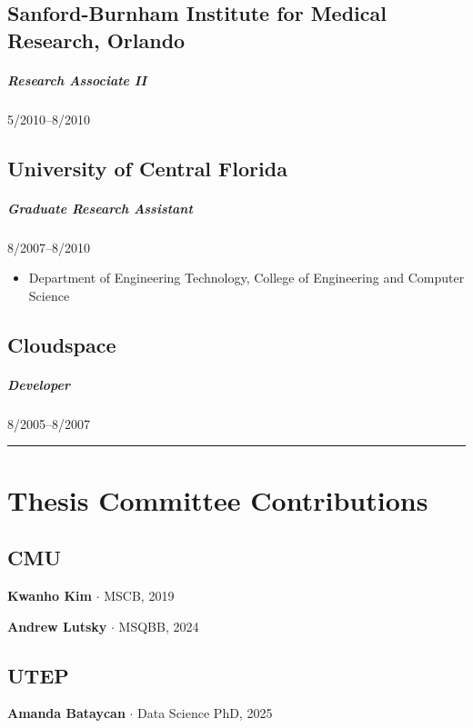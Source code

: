 \documentclass[10pt,letterpaper]{article}
\newcommand{\bigdot}{$\cdot$\xspace}
\newcommand{\cvsection}[1]{%
    \par\vspace{10pt}%
  \noindent\rule{\linewidth}{0.4pt}\par
  \vspace{-5.5ex}%
  \section*{#1}%
}
\begin{document}
\subsection*{Sanford-Burnham Institute for Medical Research, Orlando}
\vspace{-.75em}
\subparagraph{Research Associate II} 5/2010--8/2010 

\subsection*{University of Central Florida}
\vspace{-.75em}
\subparagraph{Graduate Research Assistant} 8/2007--8/2010 
\begin{itemize}
    \item Department of Engineering Technology, College of Engineering and Computer Science
\end{itemize}

\subsection*{Cloudspace}
\vspace{-.75em}
\subparagraph{Developer} 8/2005--8/2007 

\cvsection{Thesis Committee Contributions}
\subsection*{CMU}
\hspace{1.5em}\textbf{Kwanho Kim} \bigdot MSCB, 2019 

\textbf{Andrew Lutsky} \bigdot MSQBB, 2024 

\subsection*{UTEP}
\hspace{1.5em}\textbf{Amanda Bataycan} \bigdot Data Science PhD, 2025
\end{document}
